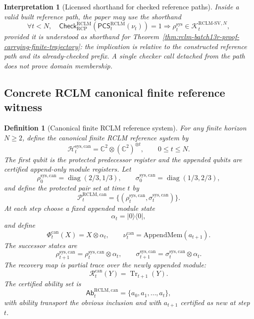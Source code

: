 \documentclass[11pt,a4paper]{article}
\newtheorem{definition}[theorem]{Definition}
\newtheorem{interpretation}[theorem]{Interpretation}
\newcommand{\Hcal}{\mathcal H}
\newcommand{\Pcal}{\mathcal P}
\newcommand{\Kcal}{\mathcal K}
\newcommand{\Tr}{\operatorname{Tr}}
\newcommand{\RCP}{\mathrm{RCP}}
\newcommand{\RCLM}{\mathrm{RCLM}}
\newcommand{\sys}{\mathrm{sys}}
\newcommand{\AppendMem}{\mathrm{AppendMem}}
\begin{document}
\begin{interpretation}[Licensed shorthand for checked reference paths]
\label{interp:rclm-batch13r-shorthand-checker-implication}
Inside a valid built reference path, the paper may use the shorthand
\[
\forall t<N,\quad
\mathsf{Check}_{\RCP}^{\RCLM}(\mathsf{PCS}_t^{\RCLM}(\nu_t))=1
\Longrightarrow
\rho_t^{\sys}\in
\Kcal_t^{\RCLM\text{-}\mathrm{SV},N},
\]
provided it is understood as shorthand for Theorem~\ref{thm:rclm-batch13r-proof-carrying-finite-trajectory}: the implication is relative to the constructed reference path and its already-checked prefix.  A single checker call detached from the path does not prove domain membership.
\end{interpretation}

\subsection{Concrete RCLM canonical finite reference witness}

\begin{definition}[Canonical finite RCLM reference system]
\label{def:rclm-batch13r-canonical-reference-system}
For any finite horizon \(N\ge2\), define the canonical finite RCLM reference system by
\[
\Hcal_t^{\sys,\mathrm{can}}
=
\mathbb C^2\otimes(\mathbb C^2)^{\otimes t},
\qquad
0\le t\le N.
\]
The first qubit is the protected predecessor register and the appended qubits are certified append-only module registers.  Let
\[
\rho_0^{\sys,\mathrm{can}}=\operatorname{diag}(2/3,1/3),
\qquad
\sigma_0^{\sys,\mathrm{can}}=\operatorname{diag}(1/3,2/3),
\]
and define the protected pair set at time \(t\) by
\[
\Pcal_t^{\RCLM,\mathrm{can}}
=
\{(\rho_t^{\sys,\mathrm{can}},\sigma_t^{\sys,\mathrm{can}})\}.
\]
At each step choose a fixed appended module state
\[
\alpha_t=|0\rangle\langle0|,
\]
and define
\[
\Phi_t^{\mathrm{can}}(X)=X\otimes\alpha_t,
\qquad
\nu_t^{\mathrm{can}}=\AppendMem(a_{t+1}).
\]
The successor states are
\[
\rho_{t+1}^{\sys,\mathrm{can}}=\rho_t^{\sys,\mathrm{can}}\otimes\alpha_t,
\qquad
\sigma_{t+1}^{\sys,\mathrm{can}}=\sigma_t^{\sys,\mathrm{can}}\otimes\alpha_t.
\]
The recovery map is partial trace over the newly appended module:
\[
\mathcal R_t^{\mathrm{can}}(Y)=\Tr_{t+1}(Y).
\]
The certified ability set is
\[
\mathsf{Ab}_t^{\RCLM,\mathrm{can}}=\{a_0,a_1,\ldots,a_t\},
\]
with ability transport the obvious inclusion and with \(a_{t+1}\) certified as new at step \(t\).
\end{definition}
\end{document}
